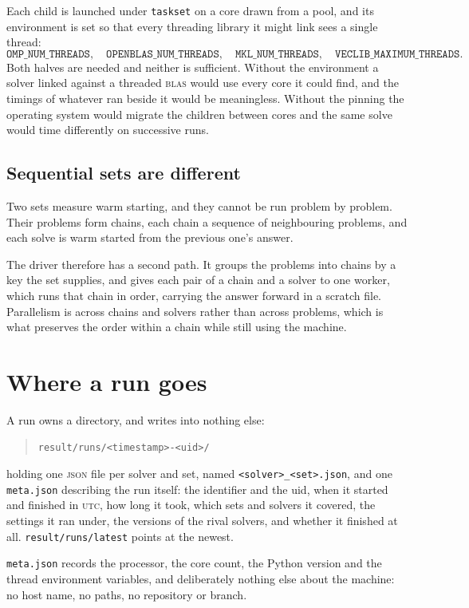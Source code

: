 \documentclass[a4paper,11pt]{book}
\theoremstyle{plain}
\theoremstyle{definition}
\theoremstyle{remark}
\numberwithin{equation}{chapter}
\numberwithin{algorithm}{chapter}
\begin{document}
	Each child is launched under \texttt{taskset} on a core drawn from a pool, and
	its environment is set so that every threading library it might link sees a
	single thread:
	\[
	\texttt{OMP\_NUM\_THREADS},\quad
	\texttt{OPENBLAS\_NUM\_THREADS},\quad
	\texttt{MKL\_NUM\_THREADS},\quad
	\texttt{VECLIB\_MAXIMUM\_THREADS} .
	\]
	Both halves are needed and neither is sufficient. Without the environment a
	solver linked against a threaded \textsc{blas} would use every core it could
	find, and the timings of whatever ran beside it would be meaningless. Without
	the pinning the operating system would migrate the children between cores and
	the same solve would time differently on successive runs.

	\subsection{Sequential sets are different}

	Two sets measure warm starting, and they cannot be run problem by problem.
	Their problems form chains, each chain a sequence of neighbouring problems,
	and each solve is warm started from the previous one's answer.

	The driver therefore has a second path. It groups the problems into chains by
	a key the set supplies, and gives each pair of a chain and a solver to one
	worker, which runs that chain in order, carrying the answer forward in a
	scratch file. Parallelism is across chains and solvers rather than across
	problems, which is what preserves the order within a chain while still using
	the machine.

	\section{Where a run goes}

	A run owns a directory, and writes into nothing else:
	\begin{quote}
		\texttt{result/runs/<timestamp>-<uid>/}
	\end{quote}
	holding one \textsc{json} file per solver and set, named
	\texttt{<solver>\_<set>.json}, and one \texttt{meta.json} describing the run
	itself: the identifier and the uid, when it started and finished in
	\textsc{utc}, how long it took, which sets and solvers it covered, the
	settings it ran under, the versions of the rival solvers, and whether it
	finished at all. \texttt{result/runs/latest} points at the newest.


	\texttt{meta.json} records the processor, the core count, the Python version
	and the thread environment variables, and deliberately nothing else about the
	machine: no host name, no paths, no repository or branch.
\end{document}
